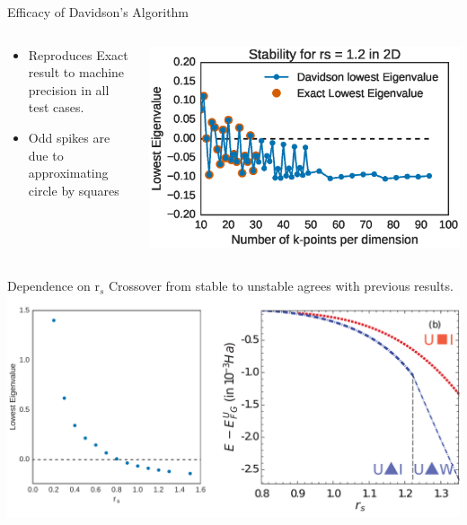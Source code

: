 \documentclass[10pt]{beamer}
\begin{document}
{{{{{{{{{{{{{{{{{{\begin{frame}{Efficacy of Davidson's Algorithm}
	\begin{columns}[c] %
		\begin{column}{.4\textwidth}
			\begin{itemize}
				\item {Reproduces Exact result to machine precision in all test cases.}
				\item {Odd spikes are due to approximating circle by squares}
			\end{itemize}				
		\end{column}
		\hfill
		\begin{column}{0.6\textwidth}
		    \begin{overprint}
			    \includegraphics[width=\linewidth]{../images/dav_vs_exact.eps}

			\end{overprint}
		\end{column}	
	\end{columns}
\end{frame}


{%
\begin{frame}{Dependence on r${}_s$}
	Crossover from stable to unstable agrees with previous results.
	\includegraphics[width=.95\linewidth]{../images/MeVsBernu.pdf}
\end{frame}


}}}}}}}}}}}}}}}}}}}
\end{document}
